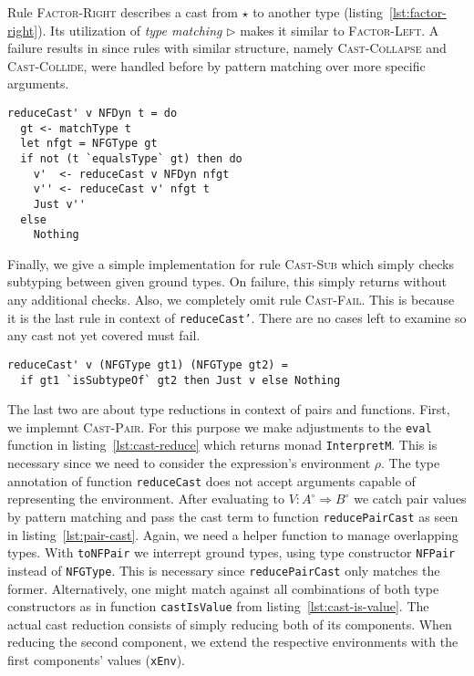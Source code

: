 Rule \textsc{Factor-Right} describes a cast from $\star$ to another type (listing~\ref{lst:factor-right}). Its utilization of \emph{type matching} $\rhd$ makes it similar to \textsc{Factor-Left}. A failure results in \blame since rules with similar structure, namely \textsc{Cast-Collapse} and \textsc{Cast-Collide}, were handled before by pattern matching over more specific arguments.

\begin{lstlisting}[float,
  caption=Rule \textsc{Factor-Right} (\texttt{Interpreter.hs}),
  label=lst:factor-right]
reduceCast' v NFDyn t = do
  gt <- matchType t
  let nfgt = NFGType gt
  if not (t `equalsType` gt) then do
    v'  <- reduceCast v NFDyn nfgt
    v'' <- reduceCast v' nfgt t
    Just v''
  else
    Nothing
\end{lstlisting}

Finally, we give a simple implementation for rule \textsc{Cast-Sub} which simply checks subtyping between given ground types. On failure, this simply returns \blame without any additional checks. Also, we completely omit rule \textsc{Cast-Fail}. This is because it is the last rule in context of \texttt{reduceCast'}. There are no cases left to examine so any cast not yet covered must fail.

\begin{lstlisting}[caption=Rule \textsc{Cast-Sub} (\texttt{Interpreter.hs})]
reduceCast' v (NFGType gt1) (NFGType gt2) =
  if gt1 `isSubtypeOf` gt2 then Just v else Nothing
\end{lstlisting}

The last two are about type reductions in context of pairs and functions. First, we implemnt \textsc{Cast-Pair}. For this purpose we make adjustments to the \texttt{eval} function in listing~\ref{lst:cast-reduce} which returns monad \texttt{InterpretM}. This is necessary since we need to consider the expression's environment $\rho$. The type annotation of function \texttt{reduceCast} does not accept arguments capable of representing the environment. After evaluating to $V : A^\circ \Rightarrow B^\circ$ we catch pair values by pattern matching and pass the cast term to function \texttt{reducePairCast} as seen in listing~\ref{lst:pair-cast}. Again, we need a helper function to manage overlapping types. With \texttt{toNFPair} we interrept ground types, using type constructor \texttt{NFPair} instead of \texttt{NFGType}. This is necessary since \texttt{reducePairCast} only matches the former. Alternatively, one might match against all combinations of both type constructors as in function \texttt{castIsValue} from listing~\ref{lst:cast-is-value}. The actual cast reduction consists of simply reducing both of its components. When reducing the second component, we extend the respective environments with the first components' values (\texttt{xEnv}).



